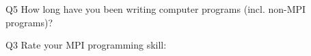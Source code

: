 \begin{description}%
\item{Q5} How long have you been writing computer programs (incl. non-MPI programs)?%
\item{Q3} Rate your MPI programming skill:%
\end{description}%

